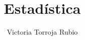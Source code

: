 \documentclass{report}
\begin{document}
\title{Estadística}
\author{Victoria Torroja Rubio}
\date{}

\maketitle

\tableofcontents

\pagebreak




\end{document}
